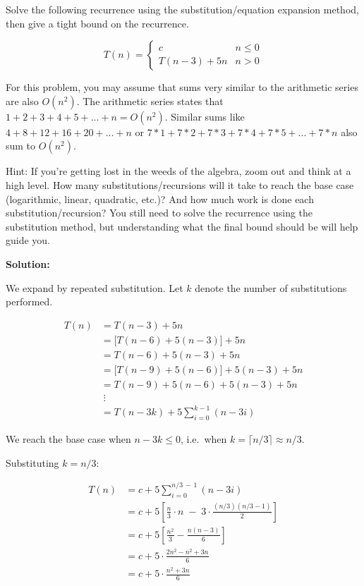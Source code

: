\documentclass[addpoints]{exam}
\begin{document}
\begin{questions}


\question[15] Solve the following recurrence using the substitution/equation expansion method, then give a tight bound on the recurrence.

\[
T(n) =
\begin{cases}
  c & n \leq 0 \\
  T(n - 3) + 5n & n > 0
\end{cases}
\]


For this problem, you may assume that sums very similar to the arithmetic series are also $O(n^2)$. The arithmetic series states that $1 + 2 + 3 + 4 + 5 + ... + n = O(n^2)$. Similar sums like $4 + 8 + 12 + 16 + 20 + ... + n$ or $7*1 + 7*2 + 7*3 + 7*4 + 7*5 + ... + 7*n$ also sum to $O(n^2)$.

Hint: If you're getting lost in the weeds of the algebra, zoom out and think at a high level. How many substitutions/recursions will it take to reach the base case (logarithmic, linear, quadratic, etc.)? And how much work is done each substitution/recursion? You still need to solve the recurrence using the substitution method, but understanding what the final bound should be will help guide you.

\textbf{Solution:}

We expand by repeated substitution. Let $k$ denote the number of substitutions performed.

\begin{align*}
T(n) &= T(n-3) + 5n \\
     &= \bigl[T(n-6) + 5(n-3)\bigr] + 5n \\
     &= T(n-6) + 5(n-3) + 5n \\
     &= \bigl[T(n-9) + 5(n-6)\bigr] + 5(n-3) + 5n \\
     &= T(n-9) + 5(n-6) + 5(n-3) + 5n \\
     &\;\vdots \\
     &= T(n - 3k) + 5\sum_{i=0}^{k-1}(n - 3i)
\end{align*}

We reach the base case when $n - 3k \leq 0$, i.e.\ when $k = \lceil n/3 \rceil \approx n/3$.

Substituting $k = n/3$:

\begin{align*}
T(n) &= c + 5\sum_{i=0}^{n/3\,-\,1}(n - 3i) \\
     &= c + 5\left[\frac{n}{3}\cdot n \;-\; 3\cdot\frac{(n/3)(n/3-1)}{2}\right] \\
     &= c + 5\left[\frac{n^2}{3} - \frac{n(n-3)}{6}\right] \\
     &= c + 5\cdot\frac{2n^2 - n^2 + 3n}{6} \\
     &= c + 5\cdot\frac{n^2 + 3n}{6}
\end{align*}


\end{questions}
\end{document}
